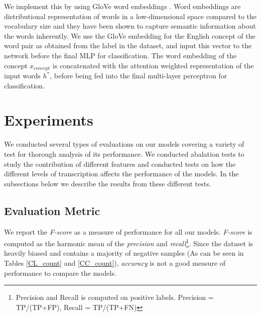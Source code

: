 \documentclass[11pt,letterpaper]{article}
\begin{document}
We implement this by using GloVe word embeddings \cite{pennington2014glove}. Word embeddings are distributional representation of words in a low-dimensional space compared to the vocabulary size and they have been shown to capture semantic information about the words inherently. We use the GloVe embedding for the English concept of the word pair as obtained from the label in the dataset, and input this vector to the network before the final MLP for classification. The word embedding of the concept $x_{concept}$ is concatenated with the attention weighted representation of the input words $h^{*}$, before being fed into the final multi-layer perceptron for classification.

\section{Experiments}

We conducted several types of evaluations on our models covering a variety of test for thorough analysis of its performance. We conducted abalation tests to study the contribution of different features and conducted tests on how the different levels of transcription affects the performance of the models. In the subsections below we describe the results from these different tests.

\subsection{Evaluation Metric}

We report the \textit{F-score} as a measure of performance for all our models. \textit{F-score} is computed as the harmonic mean of the \textit{precision} and \textit{recall}\footnote{Precision and Recall is computed on positive labels. Precision = TP/(TP+FP), Recall = TP/(TP+FN)}. Since the dataset is heavily biased and contains a majority of negative samples (As can be seen in Tables \ref{CL_count} and \ref{CC_count}), \textit{accuracy} is not a good measure of performance to compare the models.
\end{document}
